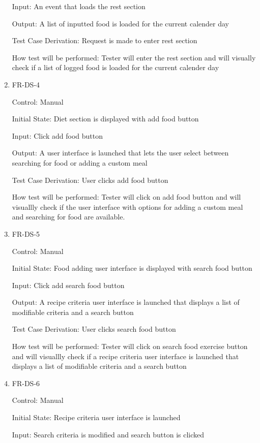 \documentclass[12pt, titlepage]{article}
\begin{document}
\begin{enumerate}
	Input: An event that loads the rest section
	
	Output: A list of inputted food is loaded for the current calender day
	
	Test Case Derivation: Request is made to enter rest section
	
	How test will be performed: Tester will enter the rest section and will visually check if a list of logged food is loaded for the current calender day
	
	\item{FR-DS-4 \\}
	
	Control: Manual
	
	Initial State: Diet section is displayed with add food button
	
	Input: Click add food button
	
	Output: A user interface is launched that lets the user select between searching for food or adding a custom meal
	
	Test Case Derivation: User clicks add food button
	
	How test will be performed: Tester will click on add food button and will visuallly check if the user interface with options for adding a custom meal and searching for food are available.
	
	\item{FR-DS-5\\}
	
	Control: Manual
	
	Initial State: Food adding user interface is displayed with search food button
	
	Input: Click add search food button
	
	Output: A recipe criteria user interface is launched that displays a list of modifiable criteria and a search button
	
	Test Case Derivation: User clicks search food button
	
	How test will be performed: Tester will click on search food exercise button and will visuallly check if a recipe criteria user interface is launched that displays a list of modifiable criteria and a search button
	
	\item{FR-DS-6\\}
	
	Control: Manual
	
	Initial State: Recipe criteria user interface is launched
	
	Input: Search criteria is modified and search button is clicked
	

\end{enumerate}
\end{document}
